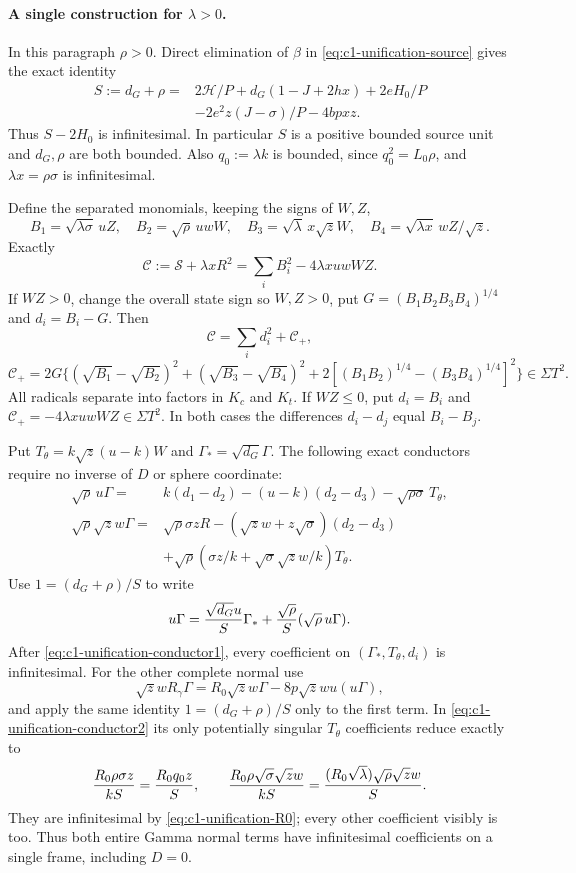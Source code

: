 \documentclass[10pt,a4paper]{article}
\begin{document}
\paragraph{A single construction for $\lambda>0$.}
In this paragraph $\rho>0$. Direct elimination of $\beta$ in
\eqref{eq:c1-unification-source} gives the exact identity
\begin{equation}\label{eq:c1-unification-S}
\begin{split}
 S:=d_G+\rho={}&2\mathcal H/P
 +d_G(1-J+2hx)+2eH_0/P\\
 &-2e^2z(J-\sigma)/P-4bpxz.
\end{split}
\end{equation}
Thus $S-2H_0$ is infinitesimal. In particular $S$ is a positive
bounded source unit and $d_G,\rho$ are both bounded. Also
$q_0:=\lambda k$ is bounded, since $q_0^2=L_0\rho$, and
$\lambda x=\rho\sigma$ is infinitesimal.

Define the separated monomials, keeping the signs of $W,Z$,
\[
 B_1=\sqrt{\lambda\sigma}\,uZ,\quad
 B_2=\sqrt\rho\,uwW,\quad
 B_3=\sqrt\lambda\,x\sqrt zW,\quad
 B_4=\sqrt{\lambda x}\,wZ/\sqrt z.
\]
Exactly
\[
 \mathscr C:=\mathscr S+\lambda xR^2
        =\sum_i B_i^2-4\lambda xuwWZ.
\]
If $WZ>0$, change the overall state sign so $W,Z>0$, put
$G=(B_1B_2B_3B_4)^{1/4}$ and $d_i=B_i-G$. Then
\[
 \mathscr C=\sum_i d_i^2+\mathscr C_+,
\]
\[
 \mathscr C_+=2G\{(\sqrt{B_1}-\sqrt{B_2})^2
 +(\sqrt{B_3}-\sqrt{B_4})^2
 +2[(B_1B_2)^{1/4}-(B_3B_4)^{1/4}]^2\}\in\Sigma T^2.
\]
All radicals separate into factors in $K_c$ and $K_t$. If $WZ\le0$,
put $d_i=B_i$ and $\mathscr C_+=-4\lambda xuwWZ\in\Sigma T^2$.
In both cases the differences $d_i-d_j$ equal $B_i-B_j$.

Put $T_\theta=k\sqrt z(u-k)W$ and $\Gamma_*=\sqrt{d_G}\Gamma$.
The following exact conductors require no inverse of $D$ or sphere
coordinate:
\begin{align}
 \sqrt\rho\,u\Gamma={}&k(d_1-d_2)-(u-k)(d_2-d_3)
                      -\sqrt{\rho\sigma}\,T_\theta,\label{eq:c1-unification-conductor1}\\
 \sqrt\rho\sqrt z w\Gamma={}&\sqrt\rho\sigma zR
 -(\sqrt z w+z\sqrt\sigma)(d_2-d_3)\nonumber\\
 &+\sqrt\rho(\sigma z/k+\sqrt\sigma\sqrt z w/k)T_\theta.
 \label{eq:c1-unification-conductor2}
\end{align}
Use $1=(d_G+\rho)/S$ to write
\[
 u\Gamma={\sqrt{d_G}u\over S}\Gamma_*
              +{\sqrt\rho\over S}(\sqrt\rho\,u\Gamma).
\]
After \eqref{eq:c1-unification-conductor1}, every coefficient on
$(\Gamma_*,T_\theta,d_i)$ is infinitesimal. For the other complete
normal use
\[
 \sqrt z wR_\gamma\Gamma=R_0\sqrt z w\Gamma
                              -8p\sqrt z wu(u\Gamma),
\]
and apply the same identity $1=(d_G+\rho)/S$ only to the first term.
In \eqref{eq:c1-unification-conductor2} its only potentially singular
$T_\theta$ coefficients reduce exactly to
\[
 {R_0\rho\sigma z\over kS}={R_0q_0z\over S},\qquad
 {R_0\rho\sqrt\sigma\sqrt z w\over kS}
       ={(R_0\sqrt\lambda)\sqrt\rho\sqrt z w\over S}.
\]
They are infinitesimal by \eqref{eq:c1-unification-R0}; every other
coefficient visibly is too. Thus both entire Gamma normal terms
have infinitesimal coefficients on a single frame, including $D=0$.
\end{document}
